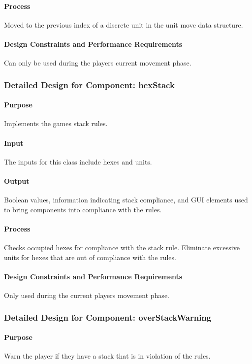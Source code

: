 \documentclass[12pt,a4paper,titlepage]{article}
\begin{document}
\paragraph{Process} Moved to the previous index of a discrete unit in the unit move data structure. 
\paragraph{Design Constraints and Performance Requirements} Can only be used during the players current movement phase.

\subsubsection{Detailed Design for Component: hexStack}
\paragraph{Purpose} Implements the games stack rules.
\paragraph{Input} The inputs for this class include hexes and units.
\paragraph{Output} Boolean values, information indicating stack compliance, and GUI elements used to bring components into compliance with the rules.
\paragraph{Process} Checks occupied hexes for compliance with the stack rule. Eliminate excessive units for hexes that are out of compliance with the rules.
\paragraph{Design Constraints and Performance Requirements} Only used during the current players movement phase. 

\subsubsection{Detailed Design for Component: overStackWarning}
\paragraph{Purpose} Warn the player if they have a stack that is in violation of the rules.
\end{document}
